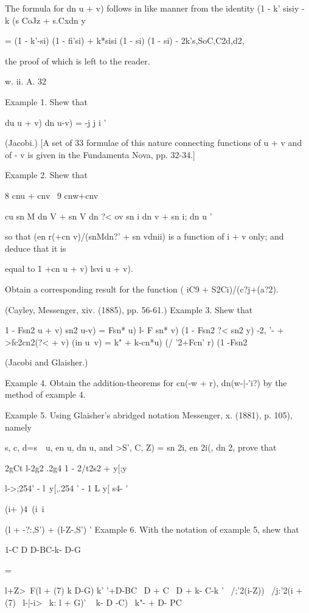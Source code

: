 The formula for dn u + v) follows in like manner from the identity (1
- k' sisiy - k (s CoJz + s.Cxdn y

= (1 - k'-si) (1 - fi'si) + k*sisi (1 - si) (1 - si) -
2k's,SoC,C2d,d2,

the proof of which is left to the reader.

w. ii. A. 32

%
%

Example 1. Shew that

du u + v) dn u-v) = -j j i ' 

(Jacobi.) [A set of 33 formulae of this nature connecting functions of
u + v and of - v is given in the Fundamenta Nova, pp. 32-34.]

Example 2. Shew that

8 cnu + cnv \ 9 cnw+cnv

cu sn M dn V + sn V dn ?< ov sn i dn v + sn i; dn u '

so that (en r(+cn v)/(snMdn?' + sn vdnii) is a function of i + v only;
and deduce that it is

equal to 1 +cn u + v) lsvi u + v).

Obtain a corresponding result for the function ( iC9 +
S2Ci)/(c?j+(a?2).

(Cayley, Messenger, xiv. (1885), pp. 56-61.) Example 3. Shew that

1 - Fsn2 u + v) sn2 u-v) = Fsn* u) l- F sn* v) (1 - Fsn2 ?< sn2 y) -2,
'- + >fc2cn2(?< + v) (in u~v) = k" + k-cn*u) (/ '2+Fcn' r) (1
-Fsn2%

(Jacobi and Glaisher.)

Example 4. Obtain the addition-theorems for cn(-w + r), dn(w-|-'i?) by
the method of example 4.

Example 5. Using Glaisher's abridged notation Messenger, x. (1881), p.
105), namely

s, c, d=s\ \ u, en u, dn u, and >S', C, Z) = sn 2i, en 2i(, dn 2,
prove that

2gCt l-2g2 .2g4 1 - 2/t2s2 + y[;y

l->;254' - l\ y[,.254 ' - 1 L y[ s4- '

(i+ )4\ (i\ i

(l + -?:,S') + (l-Z-,S') ' Example 6. With the notation of example 5,
shew that

1-C D D-BC-k- D-G

   =

l+Z>~F(l + (7) k D-G) k' '+D-BC \ D + C \ D + k- C-k ' \ /;'2(i-Z)) \
/j:'2(i + (7) ~l-|-i>~ k: l + G)' ~ k- D -C)~ k"- + D- PC

